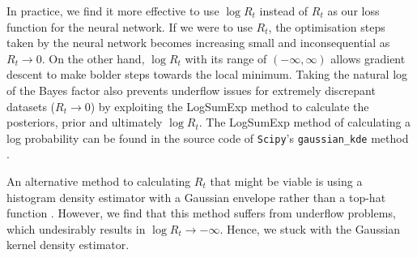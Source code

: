 \documentclass[%
 reprint,
 amsmath,amssymb,
 aps,
]{revtex4-2}
\begin{document}
In practice, we find it more effective to use $\log R_t$ instead of $R_t$ as our loss function for the neural network. If we were to use $R_t$, the optimisation steps taken by the neural network becomes increasing small and inconsequential as $R_t \to 0$. On the other hand, $\log R_t$ with its range of $(-\infty, \infty)$ allows gradient descent to make bolder steps towards the local minimum. Taking the natural log of the Bayes factor also prevents underflow issues for extremely discrepant datasets ($R_t \to 0$) by exploiting the LogSumExp method to calculate the posteriors, prior and ultimately $\log R_t$. The LogSumExp method of calculating a log probability can be found in the source code of \texttt{Scipy}'s \texttt{gaussian\_kde} method \cite{Scipy2020}.

An alternative method to calculating $R_t$ that might be viable is using a histogram density estimator with a Gaussian envelope rather than a top-hat function \cite{Schutt2017}. However, we find that this method suffers from underflow problems, which undesirably results in $\log R_t \to - \infty$. Hence, we stuck with the Gaussian kernel density estimator.




\end{document}
